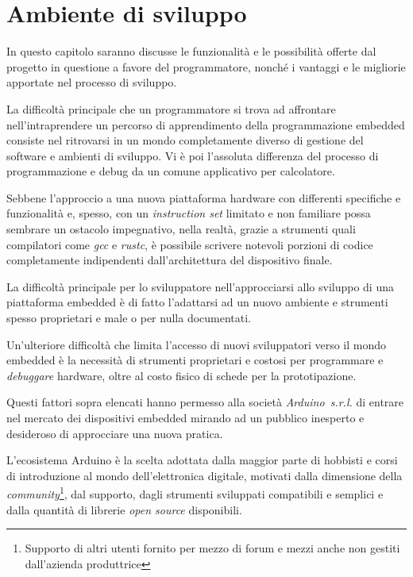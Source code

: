 \chapter{Ambiente di sviluppo}

In questo capitolo saranno discusse le funzionalità e le possibilità offerte dal progetto in questione a favore del programmatore, nonché i vantaggi e le migliorie apportate nel processo di sviluppo.

La difficoltà principale che un programmatore si trova ad affrontare nell'intraprendere un percorso di apprendimento della programmazione embedded consiste nel ritrovarsi in un mondo completamente diverso di gestione del software e ambienti di sviluppo. Vi è poi l'assoluta differenza del processo di programmazione e debug da un comune applicativo per calcolatore.

Sebbene l'approccio a una nuova piattaforma hardware con differenti specifiche e funzionalità e, spesso, con un \textit{instruction set} limitato e non familiare possa sembrare un ostacolo impegnativo, nella realtà, grazie a strumenti quali compilatori come \textit{gcc} e \textit{rustc}, è possibile scrivere notevoli porzioni di codice completamente indipendenti dall'architettura del dispositivo finale.

La difficoltà principale per lo sviluppatore nell'approcciarsi allo sviluppo di una piattaforma embedded è di fatto l'adattarsi ad un nuovo ambiente e strumenti spesso proprietari e male o per nulla documentati.

Un'ulteriore difficoltà che limita l'accesso di nuovi sviluppatori verso il mondo embedded è la necessità di strumenti proprietari e costosi per programmare e \textit{debuggare} hardware, oltre al costo fisico di schede per la prototipazione.

Questi fattori sopra elencati hanno permesso alla società \textit{Arduino~s.r.l.} di entrare nel mercato dei dispositivi embedded mirando ad un pubblico inesperto e desideroso di approcciare una nuova pratica\cite{site:arduino-about}.

L'ecosistema Arduino è la scelta adottata dalla maggior parte di hobbisti e corsi di introduzione al mondo dell'elettronica digitale, motivati dalla dimensione della \textit{community}\footnote{Supporto di altri utenti fornito per mezzo di forum e mezzi anche non gestiti dall'azienda produttrice}, dal supporto, dagli strumenti sviluppati compatibili e semplici e dalla quantità di librerie \textit{open source} disponibili.

